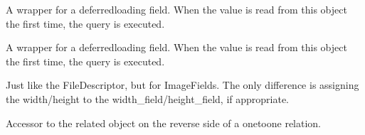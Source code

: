 \documentclass[letterpaper,10pt,french]{sphinxmanual}
\begin{document}
\begin{fulllineitems}
\begin{fulllineitems}
\end{fulllineitems}


\begin{fulllineitems}
\label{\detokenize{main/model:main.models.Personnel.contact}}
\pysigstartsignatures
{}
\pysigstopsignatures
\sphinxAtStartPar
A wrapper for a deferred\sphinxhyphen{}loading field. When the value is read from this
object the first time, the query is executed.

\end{fulllineitems}


\begin{fulllineitems}
\label{\detokenize{main/model:main.models.Personnel.datenaissance}}
\pysigstartsignatures
{}
\pysigstopsignatures
\sphinxAtStartPar
A wrapper for a deferred\sphinxhyphen{}loading field. When the value is read from this
object the first time, the query is executed.

\end{fulllineitems}


\begin{fulllineitems}
\label{\detokenize{main/model:main.models.Personnel.dernierdiplome}}
\pysigstartsignatures
{}
\pysigstopsignatures
\sphinxAtStartPar
Just like the FileDescriptor, but for ImageFields. The only difference is
assigning the width/height to the width\_field/height\_field, if appropriate.

\end{fulllineitems}


\begin{fulllineitems}
\label{\detokenize{main/model:main.models.Personnel.directeurdesetudes}}
\pysigstartsignatures
{}
\pysigstopsignatures
\sphinxAtStartPar
Accessor to the related object on the reverse side of a one\sphinxhyphen{}to\sphinxhyphen{}one
relation.


\end{fulllineitems}
\end{fulllineitems}
\end{document}
